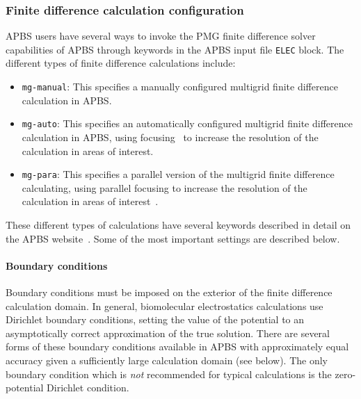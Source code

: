 \documentclass[12pt,titlepage]{article}
\newcommand{\keyword}[1]{\texttt{#1}}
\begin{document}
\subsubsection{Finite difference calculation configuration} \label{sec:fd-config}
APBS users have several ways to invoke the PMG finite difference solver~\cite{Holst1993} capabilities of APBS through keywords in the APBS input file \keyword{ELEC} block.
The different types of finite difference calculations include:
\begin{itemize}
	\item \keyword{mg-manual}: This specifies a manually configured multigrid finite difference calculation in APBS.
	\item \keyword{mg-auto}: This specifies an automatically configured multigrid finite difference calculation in APBS, using focusing~\cite{Gilson1988} to increase the resolution of the calculation in areas of interest.
	\item \keyword{mg-para}:  This specifies a parallel version of the multigrid finite difference calculating, using parallel focusing to increase the resolution of the calculation in areas of interest~\cite{Baker2001a}.
\end{itemize}
These different types of calculations have several keywords described in detail on the APBS website~\cite{APBSweb}.
Some of the most important settings are described below.

\paragraph{Boundary conditions}
Boundary conditions must be imposed on the exterior of the finite difference calculation domain.
In general, biomolecular electrostatics calculations use Dirichlet boundary conditions, setting the value of the potential to an asymptotically correct approximation of the true solution.
There are several forms of these boundary conditions available in APBS with approximately equal accuracy given a sufficiently large calculation domain (see below).
The only boundary condition which is \emph{not} recommended for typical calculations is the zero-potential Dirichlet condition.
\end{document}

